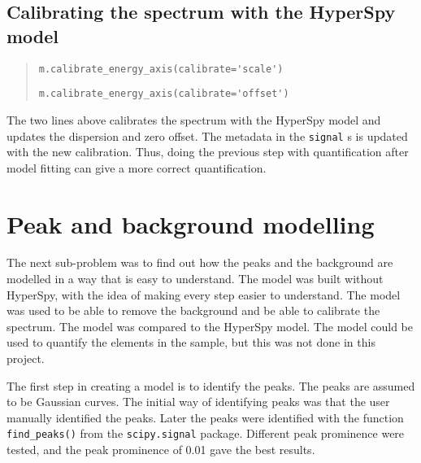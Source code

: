 \subsection{Calibrating the spectrum with the HyperSpy model}
\label{sec:discussion:steps:HyperSpycalibration}

\begin{quote}

    \verb|m.calibrate_energy_axis(calibrate='scale')|

    \verb|m.calibrate_energy_axis(calibrate='offset')|

\end{quote}

The two lines above calibrates the spectrum with the HyperSpy model and updates the dispersion and zero offset.
The metadata in the \verb|signal| s is updated with the new calibration.
Thus, doing the previous step with quantification after model fitting can give a more correct quantification.
%
%
%

%
%
\section{Peak and background modelling}
\label{sec:discussion:modelling}

The next sub-problem was to find out how the peaks and the background are modelled in a way that is easy to understand.
The model was built without HyperSpy, with the idea of making every step easier to understand.
The model was used to be able to remove the background and be able to calibrate the spectrum.
The model was compared to the HyperSpy model.
The model could be used to quantify the elements in the sample, but this was not done in this project.

The first step in creating a model is to identify the peaks.
The peaks are assumed to be Gaussian curves.
The initial way of identifying peaks was that the user manually identified the peaks.
Later the peaks were identified with the function \verb|find_peaks()| from the \verb|scipy.signal| package.
Different peak prominence were tested, and the peak prominence of 0.01 gave the best results.


